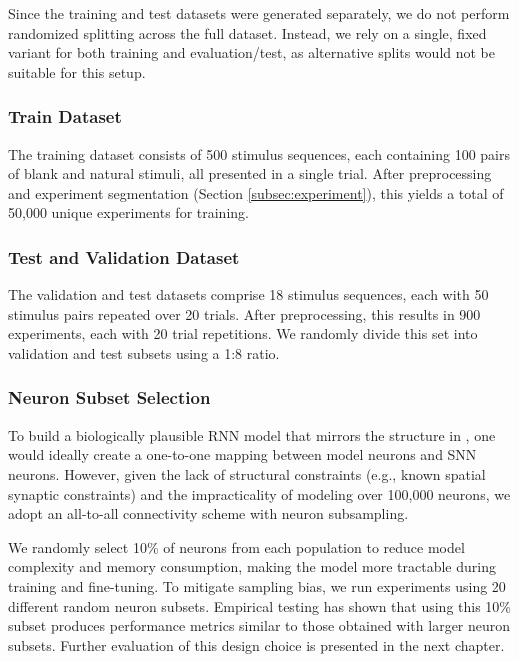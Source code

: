 Since the training and test datasets were generated separately, we do not perform randomized splitting across the full dataset. Instead, we rely on a single, fixed variant for both training and evaluation/test, as alternative splits would not be suitable for this setup.

\subsubsection{Train Dataset}
\label{subsubsec:train_dataset}

The training dataset consists of 500 stimulus sequences, each containing 100 pairs of blank and natural stimuli, all presented in a single trial. After preprocessing and experiment segmentation (Section \ref{subsec:experiment}), this yields a total of 50,000 unique experiments for training.

\subsubsection{Test and Validation Dataset}
\label{subsubsec:test_dataset}

The validation and test datasets comprise 18 stimulus sequences, each with 50 stimulus pairs repeated over 20 trials. After preprocessing, this results in 900 experiments, each with 20 trial repetitions. We randomly divide this set into validation and test subsets using a 1:8 ratio.

\subsubsection{Neuron Subset Selection}
\label{subsubsec:subset_selection}

To build a biologically plausible RNN model that mirrors the structure in \citet{antolik2024comprehensive}, one would ideally create a one-to-one mapping between model neurons and SNN neurons. However, given the lack of structural constraints (e.g., known spatial synaptic constraints) and the impracticality of modeling over 100,000 neurons, we adopt an all-to-all connectivity scheme with neuron subsampling.

We randomly select 10\% of neurons from each population to reduce model complexity and memory consumption, making the model more tractable during training and fine-tuning. To mitigate sampling bias, we run experiments using 20 different random neuron subsets. Empirical testing has shown that using this 10\% subset produces performance metrics similar to those obtained with larger neuron subsets. Further evaluation of this design choice is presented in the next chapter.


